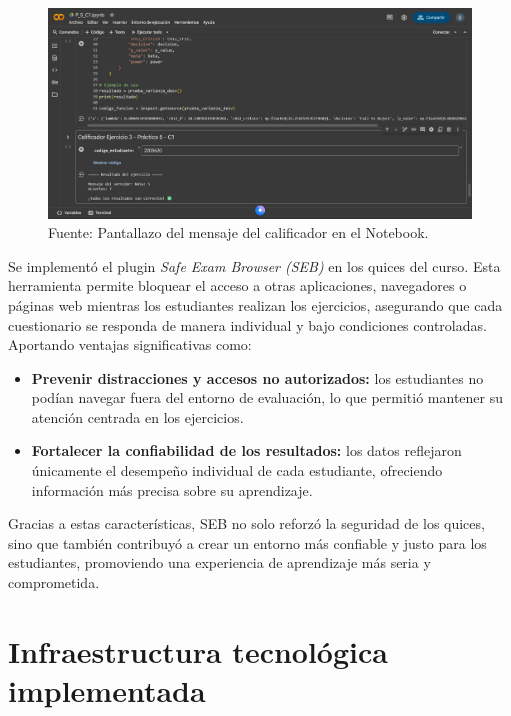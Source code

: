 \documentclass[letter,oneside,12pt,spanish]{report}
\begin{document}
\begin{figure}[ht]
	\centering
	\includegraphics[width=1\textwidth]{Figs/Colab.pdf}
	\label{fig:Colab}
	\\Fuente: Pantallazo del mensaje del calificador en el Notebook.
\end{figure}

Se implementó el plugin \textit{Safe Exam Browser (SEB)} en los quices del curso. Esta herramienta permite bloquear el acceso a otras aplicaciones, navegadores o páginas web mientras los estudiantes realizan los ejercicios, asegurando que cada cuestionario se responda de manera individual y bajo condiciones controladas. Aportando ventajas significativas como:

\begin{itemize}
    \item \textbf{Prevenir distracciones y accesos no autorizados:} los estudiantes no podían navegar fuera del entorno de evaluación, lo que permitió mantener su atención centrada en los ejercicios.
    \item \textbf{Fortalecer la confiabilidad de los resultados:} los datos reflejaron únicamente el desempeño individual de cada estudiante, ofreciendo información más precisa sobre su aprendizaje.
\end{itemize}

Gracias a estas características, SEB no solo reforzó la seguridad de los quices, sino que también contribuyó a crear un entorno más confiable y justo para los estudiantes, promoviendo una experiencia de aprendizaje más seria y comprometida.

\section{Infraestructura tecnológica implementada}
\end{document}
